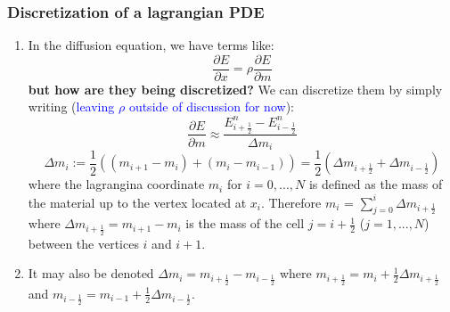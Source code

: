\documentclass[11pt]{article}
\begin{document}
\subsubsection{Discretization of a lagrangian PDE}
\begin{enumerate}
  \item In the diffusion equation, we have terms like:
  \begin{equation}
    \frac{\partial E}{\partial x} = \rho \frac{\partial E}{\partial m}
  \end{equation}
  \textbf{but how are they being discretized?}
  We can discretize them by simply writing (\textcolor{blue}{leaving $\rho$ outside of discussion for now}):
  \begin{equation}
    \frac{\partial E}{\partial m} \approx \frac{E_{i+\frac{1}{2}}^{n} - E_{i-\frac{1}{2}}^{n}}{\Delta m_i}
  \end{equation}
  \begin{equation}
    \Delta m_i := \frac{1}{2} \left((m_{i+1} - m_{i}) + (m_{i} - m_{i-1})\right) = \frac{1}{2} (\Delta m_{i+\frac{1}{2}} + \Delta m_{i-\frac{1}{2}})
  \end{equation}
  where the lagrangina coordinate $m_i$ for $i=0,...,N$ is defined as the mass of the material up to the vertex located at $x_i$. Therefore $m_i$ = $\sum_{j = 0}^{i} \Delta m_{i+\frac{1}{2}}$ where $\Delta m_{i+\frac{1}{2}} = m_{i+1} - m_{i}$ is the mass of the cell $j = i+\frac{1}{2}$ ($j = 1,...,N$) between the vertices $i$ and $i+1$. 
  \item It may also be denoted $\Delta m_i = m_{i+\frac{1}{2}} - m_{i-\frac{1}{2}}$ where $m_{i+\frac{1}{2}} = m_{i} + \frac{1}{2} \Delta m_{i+\frac{1}{2}}$ and $m_{i-\frac{1}{2}} = m_{i-1} + \frac{1}{2} \Delta m_{i-\frac{1}{2}}$.


\end{enumerate}
\end{document}
